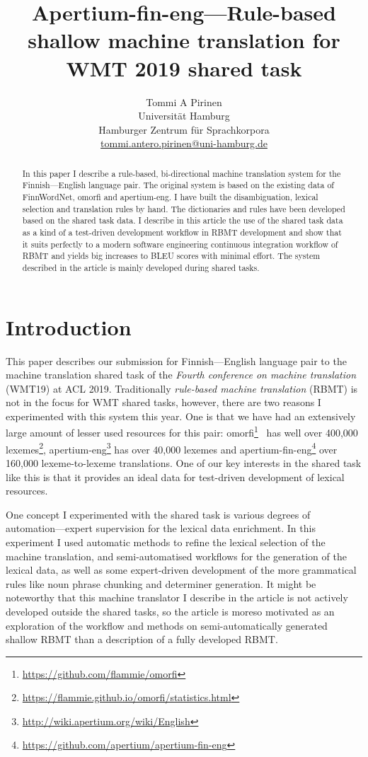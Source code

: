 \documentclass[11pt,a4paper]{article}
\title{Apertium-fin-eng---Rule-based shallow machine translation for WMT 2019
shared task}
\author{Tommi A Pirinen\\
    Universit\"at Hamburg\\
    Hamburger Zentrum f\"ur Sprachkorpora\\
    \url{tommi.antero.pirinen@uni-hamburg.de}
}
\begin{document}
\maketitle
\begin{abstract}
    In this paper I describe a rule-based, bi-directional machine translation
    system for the Finnish---English language pair. The original system is
    based on the existing data of FinnWordNet, omorfi and apertium-eng.
    I have built the disambiguation, lexical selection and translation rules
    by hand. The dictionaries and rules have been developed based
    on the shared task data. I describe in this article the use of the
    shared task data as a kind of a test-driven development workflow in RBMT
    development and show that it suits perfectly to a modern software
    engineering continuous integration workflow of RBMT and yields big increases
    to BLEU scores with minimal effort. The system described in the article
    is mainly developed during shared tasks.\@
\end{abstract}


\section{Introduction}
\label{sec:introduction}

This paper describes our submission for Finnish---English language pair to the
machine translation shared task of the \textit{Fourth conference on machine
translation} (WMT19) at ACL 2019. Traditionally \textit{rule-based machine
translation} (RBMT) is not in the focus for WMT shared tasks, however,
there are two reasons I experimented with this system this year. One is that we
have had an extensively large amount of lesser used resources for this pair:
omorfi\footnote{\url{https://github.com/flammie/omorfi}}~\cite{omorfi} has well
over 400,000
lexemes\footnote{\url{https://flammie.github.io/omorfi/statistics.html}},
apertium-eng\footnote{\url{http://wiki.apertium.org/wiki/English}} has over
40,000 lexemes and
apertium-fin-eng\footnote{\url{https://github.com/apertium/apertium-fin-eng}}
over 160,000 lexeme-to-lexeme translations. One of our key interests in the
shared task like this is that it provides an ideal data for test-driven
development of lexical resources.

One concept I experimented with the shared task is various degrees of
automation---expert supervision for the lexical data enrichment. In this
experiment I used automatic methods to refine the lexical selection of the
machine translation, and semi-automatised workflows for the generation
of the lexical data, as well as some expert-driven development of the more
grammatical rules like noun phrase chunking and determiner generation.
It might be noteworthy that this machine translator I describe in the
article is not actively developed outside the shared tasks,
so the article is moreso motivated as 
an exploration of the workflow and methods on semi-automatically generated
shallow RBMT than a description of a fully developed RBMT. 
\end{document}
